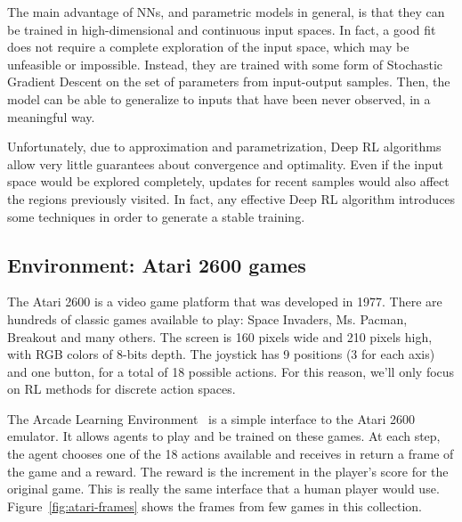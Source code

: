 The main advantage of NNs, and parametric models in general, is that they can
be trained in high-dimensional and continuous input spaces. In fact, a good
fit does not require a complete exploration of the input space, which may be
unfeasible or impossible. Instead, they are trained with some form of
Stochastic Gradient Descent on the set of parameters from input-output
samples. Then, the model can be able to generalize to inputs that have been
never observed, in a meaningful way.

Unfortunately, due to approximation and parametrization, Deep RL algorithms
allow very little guarantees about convergence and optimality. Even if the
input space would be explored completely, updates for recent samples would
also affect the regions previously visited. In fact, any effective Deep RL
algorithm introduces some techniques in order to generate a stable training.


\subsection{Environment: Atari 2600 games}

\label{sec:atari-envs}

The Atari 2600 is a video game platform that was developed in 1977. There are
hundreds of classic games available to play: Space Invaders, Ms. Pacman,
Breakout and many others. The screen is 160 pixels wide and 210 pixels high,
with RGB colors of 8-bits depth. The joystick has 9 positions (3 for each
axis) and one button, for a total of 18 possible actions. For this reason,
we'll only focus on RL methods for discrete action spaces.

The Arcade Learning Environment~\cite{bib:atari-games} is a simple interface
to the Atari 2600 emulator. It allows agents to play and be trained on these
games. At each step, the agent chooses one of the 18 actions available and
receives in return a frame of the game and a reward. The reward is the
increment in the player's score for the original game. This is really the same
interface that a human player would use. Figure~\ref{fig:atari-frames} shows
the frames from few games in this collection. 


